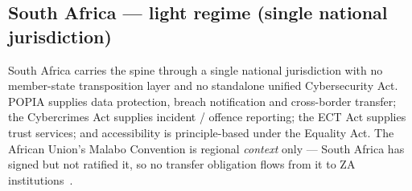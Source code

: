 \subsection{South Africa --- light regime (single national jurisdiction)}
\label{sec:reg-za}

South Africa carries the spine through a single national jurisdiction
with no member-state transposition layer and no standalone unified
Cybersecurity Act. POPIA supplies data protection, breach notification
and cross-border transfer; the Cybercrimes Act supplies incident /
offence reporting; the ECT Act supplies trust services; and
accessibility is principle-based under the Equality Act. The African
Union's Malabo Convention is regional \emph{context} only --- South
Africa has signed but not ratified it, so no transfer obligation flows
from it to ZA institutions~\cite{za_malabo}.

